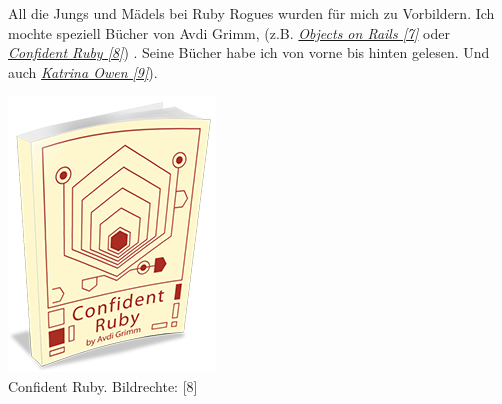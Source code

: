 All die Jungs und Mädels bei Ruby Rogues wurden für mich zu Vorbildern. Ich mochte speziell Bücher von  Avdi Grimm, (z.B. \href{http://objectsonrails.com/}{\textit{Objects on Rails [7]}} oder \href{http://www.confidentruby.com/}{\textit{Confident Ruby [8]}}) 
. Seine Bücher habe ich von vorne bis hinten gelesen. Und auch \href{http://kytrinyx.com/}{\textit{Katrina Owen [9]}}). \\
\begin{center}
\includegraphics[width=\linewidth]{floor/floor-ruby.png} \\
\footnotesize{Confident Ruby. Bildrechte: [8]} \\

\end{center}
